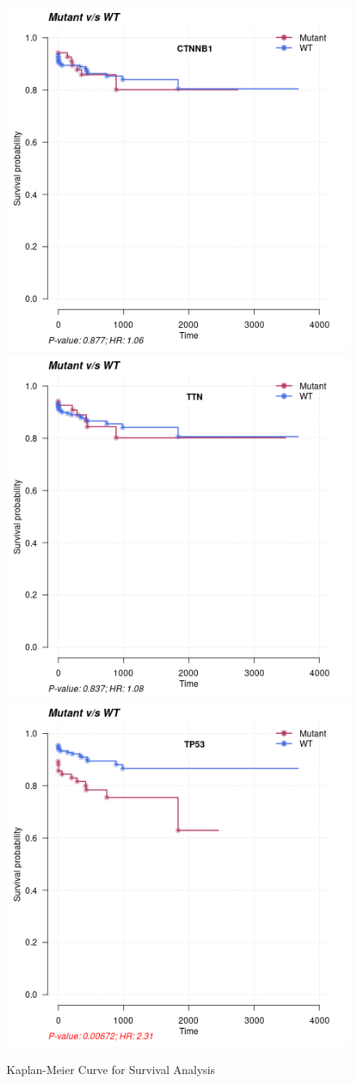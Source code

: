 \documentclass[12pt, ]{article}
\begin{document}
\begin{figure}[!htbp]
\centering
\includegraphics[width=.45\textwidth]{plots/KM_lihc_mutect[CTNNB1].png}
\includegraphics[width=.45\textwidth]{plots/KM_lihc_mutect[TTN].png}
\includegraphics[width=.45\textwidth]{plots/KM_lihc_mutect[TP53].png}
\caption{Kaplan-Meier Curve for Survival Analysis}
\label{fig:kmplot}
\end{figure}
\end{document}
